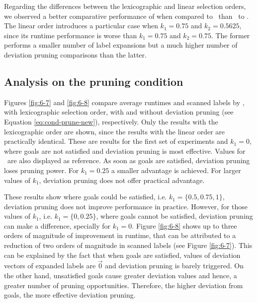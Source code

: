 Regarding the differences between the lexicographic and linear selection orders, we observed a better comparative performance of \lexgolex when compared to \namoalex \ than \lexgolin \ to \namoalin. The linear order introduces a particular case when $k_1=0.75$ and $k_2=0.5625$, since its runtime performance is worse than $k_1=0.75$ and $k_2=0.75$. The former performs a smaller number of label expansions but a much higher number of deviation pruning comparisons than the latter.

\subsection{Analysis on the pruning condition}
\label{chapEmpiricalAnalysis:subsec:analysisgridspruning}

Figures \ref{fig:6-7} and \ref{fig:6-8} compare average runtimes and scanned labels by \lexgo, with lexicographic selection order, with and without deviation pruning (see Equation \ref{eq:cond-prune-new}), respectively. Only the results with the lexicographic order are shown, since the results with the linear order are practically identical. These are results for the first set of experiments and $k_1 = 0$, where goals are not satisfied and deviation pruning is most effective. Values for \namoa \ are also displayed as reference. As soon as goals are satisfied, deviation pruning loses pruning power. For $k_1 = 0.25$ a smaller advantage is achieved. For larger values of $k_1$, deviation pruning does not offer practical advantage.

These results show where goals could be satisfied, i.e. $k_1 = \{0.5, 0.75, 1 \}$, deviation pruning does not improve performance in practice. However, for those values of $k_1$, i.e. $k_1 = \{0, 0.25\}$, where goals cannot be satisfied, deviation pruning can make a difference, specially for $k_1 = 0$. Figure \ref{fig:6-8} shows up to three orders of magnitude of improvement in runtime, that can be attributed to a reduction of two orders of magnitude in scanned labels (see Figure \ref{fig:6-7}). This can be explained by the fact that when goals are satisfied, values of deviation vectors of expanded labels are $\vec 0$ and deviation pruning is barely triggered. On the other hand, unsatisfied goals cause greater deviation values and hence, a greater number of pruning opportunities. Therefore, the higher deviation from goals, the more effective deviation pruning.  

